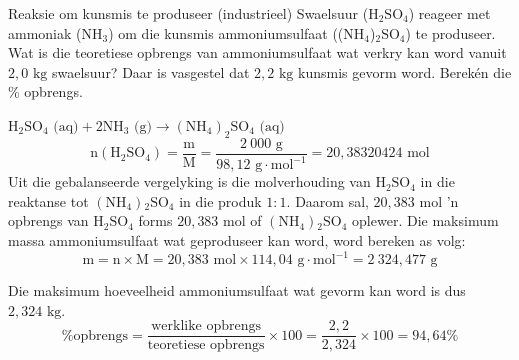  \label{m38712*secfhsst!!!underscore!!!id2067}
      \noindent 
      \begin{wex}{Reaksie om kunsmis te produseer (industrieel) }
{
\label{m38712*probfhsst!!!underscore!!!id2068}
      \label{m38712*id284606}Swaelsuur ($\text{H}{}_{2}\text{SO}{}_{4}$) reageer met ammoniak ($\text{NH}{}_{3}$) om die kunsmis ammoniumsulfaat (($\text{NH}{}_{4}$)${}_{2}\text{SO}{}_{4}$) te produseer. Wat is die teoretiese opbrengs van ammoniumsulfaat wat verkry kan word vanuit $2,0 \text{ kg}$ swaelsuur? Daar is vasgestel dat $2,2 \text{ kg}$ kunsmis gevorm word. Berekén die $\%$ opbrengs. }
{
      \label{m38712*id284813}\nopagebreak\noindent{}
\label{m38712*id284690}${\text{H}}_{2}{\text{SO}}_{4} \text{ (aq)} + 2{\text{NH}}_{3}\text{ (g)} \to {({\text{NH}}_{4})}_{2}{\text{SO}}_{4}  \text{ (aq)}$
    \begin{equation*}
    \text{n} ({\text{H}}_{2}{\text{SO}}_{4}) = \frac{\text{m}}{\text{M}} = \frac{2~000 \text{ g}}{98,12 \text{ g} \cdot {\text{mol}}^{-1}} = 20,38320424\text{ mol}
      \end{equation*}
      \label{m38712*id285156}Uit die gebalanseerde vergelyking is die molverhouding van $\text{H}{}_{2}\text{SO}{}_{4}$ in die reaktanse tot $(\text{NH}{}_{4}){}_{2}\text{SO}{}_{4}$ in die produk $1:1$. Daarom sal, $20,383 \text{ mol}$   'n opbrengs van  $\text{H}{}_{2}\text{SO}{}_{4}$ forms $20,383 \text{ mol}$ of $(\text{NH}{}_{4}){}_{2}\text{SO}{}_{4}$ oplewer. 
      \label{m38712*id285290}Die maksimum massa ammoniumsulfaat wat geproduseer kan word, word bereken as volg:
      \label{m38712*id285296}\nopagebreak\noindent{}
    \begin{equation*}
    \text{m}=\text{n} \times \text{M} = 20,383 \text{ mol} \times 114,04 \text{ g} \cdot {\text{mol}}^{-1} = 2~324,477 \text{ g}
      \end{equation*}
      
      \label{m38712*id285362}Die maksimum hoeveelheid ammoniumsulfaat wat gevorm kan word is dus $2,324 \text{ kg}$.
\begin{equation*}
\text{\% opbrengs} = \frac{\text{werklike opbrengs}}{\text{teoretiese opbrengs}} \times 100 = \frac{2,2}{2,324} \times 100 = 94,64 \%\end{equation*}
}
    \end{wex}
\label{m38717*secfhsst!!!underscore!!!id695}
